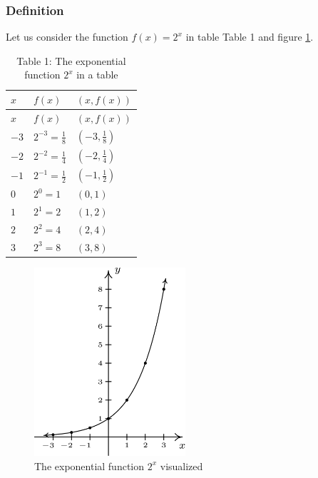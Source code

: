 \documentclass[
  12pt,
  oneside]{book}
\theoremstyle{definition}
\theoremstyle{definition}
\theoremstyle{definition}
\theoremstyle{definition}
\theoremstyle{remark}
\begin{document}
\subsubsection{Definition}\label{definition}

Let us consider the function \(f(x) = 2^{x}\) in table Table 1 and figure \ref{fig:IntroExpLogs-1}.

\begin{longtable}[]{@{}lll@{}}
\caption{Table 1: The exponential function \(2^{x}\) in a table}\tabularnewline
\toprule\noalign{}
\(x\) & \(f(x)\) & \((x,f(x))\) \\
\midrule\noalign{}
\endfirsthead
\toprule\noalign{}
\(x\) & \(f(x)\) & \((x,f(x))\) \\
\midrule\noalign{}
\endhead
\bottomrule\noalign{}
\endlastfoot
\(-3\) & \(2^{-3} = \frac{1}{8}\) & \((-3, \frac{1}{8})\) \\
\(-2\) & \(2^{-2} = \frac{1}{4}\) & \((-2, \frac{1}{4})\) \\
\(-1\) & \(2^{-1} = \frac{1}{2}\) & \((-1, \frac{1}{2})\) \\
\(0\) & \(2^{0} = 1\) & \((0 ,1)\) \\
\(1\) & \(2^{1} = 2\) & \((1, 2)\) \\
\(2\) & \(2^{2} = 4\) & \((2,4)\) \\
\(3\) & \(2^{3} = 8\) & \((3, 8)\) \\
\end{longtable}

\begin{figure}
\centering
\includegraphics[width=0.5\textwidth,height=\textheight]{fig/IntroExpLogs-1.png}
\caption{\label{fig:IntroExpLogs-1} The exponential function \(2^{x}\) visualized}
\end{figure}
\end{document}
